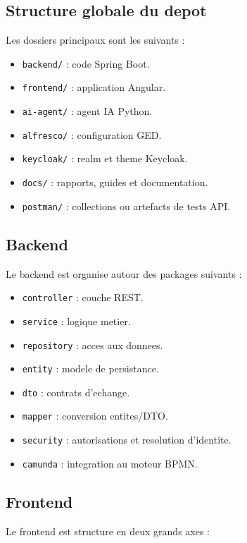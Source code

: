 \documentclass[12pt,a4paper]{article}
\begin{document}
\subsection{Structure globale du depot}

Les dossiers principaux sont les suivants :

\begin{itemize}[leftmargin=1.2cm]
  \item \texttt{backend/} : code Spring Boot.
  \item \texttt{frontend/} : application Angular.
  \item \texttt{ai-agent/} : agent IA Python.
  \item \texttt{alfresco/} : configuration GED.
  \item \texttt{keycloak/} : realm et theme Keycloak.
  \item \texttt{docs/} : rapports, guides et documentation.
  \item \texttt{postman/} : collections ou artefacts de tests API.
\end{itemize}

\subsection{Backend}

Le backend est organise autour des packages suivants :

\begin{itemize}[leftmargin=1.2cm]
  \item \texttt{controller} : couche REST.
  \item \texttt{service} : logique metier.
  \item \texttt{repository} : acces aux donnees.
  \item \texttt{entity} : modele de persistance.
  \item \texttt{dto} : contrats d'echange.
  \item \texttt{mapper} : conversion entites/DTO.
  \item \texttt{security} : autorisations et resolution d'identite.
  \item \texttt{camunda} : integration au moteur BPMN.
\end{itemize}

\subsection{Frontend}

Le frontend est structure en deux grands axes :
\end{document}
